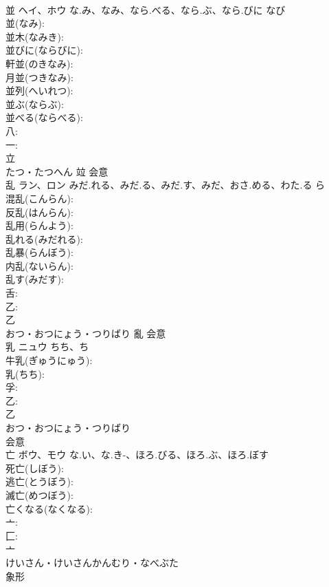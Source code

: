 \documentclass[8pt]{extreport}
\begin{document}
\begin{CJK}{UTF8}{min}
\\	並	ヘイ、ホウ	な.み、なみ、なら.べる、なら.ぶ、なら.びに	なび	
\\	並(なみ): 
\\	並木(なみき): 
\\	並びに(ならびに): 
\\	軒並(のきなみ): 
\\	月並(つきなみ): 
\\	並列(へいれつ): 
\\	並ぶ(ならぶ): 
\\	並べる(ならべる): 
\\	八: 
\\	一: 
\\	立	
\\	たつ・たつへん	竝	会意 
\\	乱	ラン、ロン	みだ.れる、みだ.る、みだ.す、みだ、おさ.める、わた.る	ら	
\\	混乱(こんらん): 
\\	反乱(はんらん): 
\\	乱用(らんよう): 
\\	乱れる(みだれる): 
\\	乱暴(らんぼう): 
\\	内乱(ないらん): 
\\	乱す(みだす): 
\\	舌: 
\\	乙: 
\\	乙	
\\	おつ・おつにょう・つりばり	亂	会意 
\\	乳	ニュウ	ちち、ち		
\\	牛乳(ぎゅうにゅう): 
\\	乳(ちち): 
\\	孚: 
\\	乙: 
\\	乙	
\\	おつ・おつにょう・つりばり	
\\	会意 
\\	亡	ボウ、モウ	な.い、な.き-、ほろ.びる、ほろ.ぶ、ほろ.ぼす		
\\	死亡(しぼう): 
\\	逃亡(とうぼう): 
\\	滅亡(めつぼう): 
\\	亡くなる(なくなる): 
\\	亠: 
\\	匚: 
\\	亠	
\\	けいさん・けいさんかんむり・なべぶた	
\\	象形 

\end{CJK}
\end{document}
